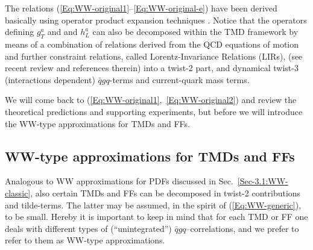 \documentclass[a4paper,11pt]{article}
\begin{document}
The relations (\ref{Eq:WW-original1}--\ref{Eq:WW-original-e})
have been derived basically using operator product expansion
techniques \cite{Wandzura:1977qf,Jaffe:1991ra}. Notice that the 
operators defining $g_T^a$ and and $h_L^a$ can also be decomposed 
within the TMD framework by means of a combination of relations 
derived from the QCD equations of motion and further 
constraint relations, called Lorentz-Invariance Relations (LIRs), 
(see recent review \cite{Kanazawa:2015ajw} and references therein) 
into a twist-2 part, and dynamical twist-3 (interactions dependent) 
$\bar{q}gq$-terms and current-quark mass terms.

We will come back to (\ref{Eq:WW-original1},~\ref{Eq:WW-original2}) and 
review the theoretical predictions and supporting experiments, but before
we will introduce the WW-type approximations for TMDs and FFs.

\subsection{WW-type approximations for TMDs and FFs}
\label{Sec-3.2:WW-type-TMD-FF}

Analogous to WW approximations for PDFs discussed in 
Sec.~\ref{Sec-3.1:WW-classic}, also certain TMDs and FFs
can be decomposed in twist-2 contributions and tilde-terms.
The latter may be assumed, in the spirit of (\ref{Eq:WW-generic}),
to be small. Hereby it is important to keep in mind that for each TMD
or FF one deals 
with different types of (``unintegrated'') $\bar{q}gq$--correlations,
and we prefer to refer to them as WW-type approximations.
\end{document}
